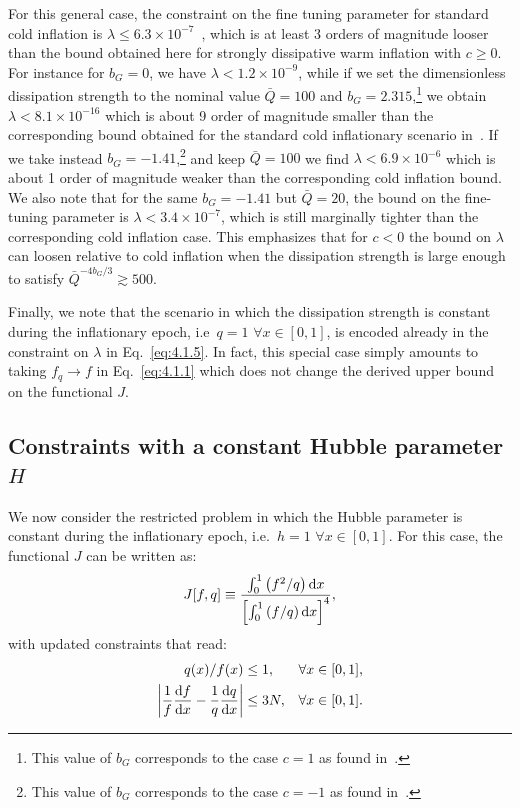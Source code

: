\documentclass[aps,prd,twocolumn,amssymb,amsmath,floatfix,nofootinbib,superscriptaddress,preprintnumbers]{revtex4-1}
\begin{document}
For this general case, the constraint on the fine tuning parameter for standard cold inflation is $\lambda\leq 6.3\times 10^{-7}$~\cite{Adams:1990pn}, which is at least 3 orders of magnitude looser than the bound obtained here for strongly dissipative warm inflation with $c\geq 0$. For instance for $b_G=0$, we have $\lambda<1.2\times 10^{-9}$, while if we set the dimensionless dissipation strength to the nominal value $\bar{Q}=100$ and $b_G=2.315$,\footnote{This value of $b_G$ corresponds to the case $c=1$ as found in~\cite{Bastero-Gil:2016qru,Benetti:2016jhf}.} we obtain $\lambda<8.1\times 10^{-16}$ which is about 9 order of magnitude smaller than the corresponding bound obtained for the standard cold inflationary scenario in~\cite{Adams:1990pn}. If we take instead $b_G=-1.41$,\footnote{This value of $b_G$ corresponds to the case $c=-1$ as found in~\cite{Motaharfar:2018zyb}.} and keep $\bar{Q}=100$ we find $\lambda<6.9\times 10^{-6}$ which is about 1 order of magnitude weaker than the corresponding cold inflation bound. We also note that for the same $b_G=-1.41$ but $\bar{Q}=20$, the bound on the fine-tuning parameter is $\lambda<3.4\times 10^{-7}$, which is still marginally tighter than the corresponding cold inflation case. This emphasizes that for $c<0$ the bound on $\lambda$ can loosen relative to cold inflation when the dissipation strength is large enough to satisfy $\bar{Q}^{-4 b_G/3}\gtrsim 500$.

Finally, we note that the scenario in which the dissipation strength is constant during the inflationary epoch, i.e\ $q=1$ $\forall x\in[0,1]$, is encoded already in the constraint on $\lambda$ in Eq.~\ref{eq:4.1.5}. In fact, this special case simply amounts to taking $f_q\rightarrow f$ in Eq.~\ref{eq:4.1.1} which does not change the derived upper bound on the functional $J$. 

\subsection{Constraints with a constant Hubble parameter $H$}
\label{sec:4.2}

We now consider the restricted problem in which the Hubble parameter is constant during the inflationary epoch, i.e.\ $h=1$ $\forall x\in[0,1]$. For this case, the functional $J$ can be written as:
\begin{equation}
    J[f,q] \equiv \frac{\int_{0}^{1}\left (f^{2}/q\right) {\rm d} x}{\left[\int_{0}^{1}\left(f/q \right)  {\rm d} x\right]^{4}}, \label{eq:4.2.1}
\end{equation}
with updated constraints that read:
\begin{align}
    q(x)/f(x)&\leq 1, & \forall x \in[0,1], \label{eq:4.2.2}\\
\left|\frac{1}{f} \frac{{\rm d} f}{{\rm d} x} -\frac{1}{q}\frac{{\rm d}q}{{\rm d}x}\right| &\leq 3 N, & \forall x \in[0,1]. \label{eq:4.2.3}
\end{align}
\end{document}

